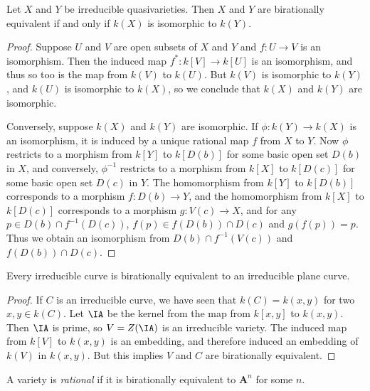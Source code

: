 \begin{theorem}
    Let $X$ and $Y$ be irreducible quasivarieties. Then $X$ and $Y$ are birationally equivalent if and only if $k(X)$ is isomorphic to $k(Y)$.
\end{theorem}
\begin{proof}
    Suppose $U$ and $V$ are open subsets of $X$ and $Y$ and $f: U \to V$ is an isomorphism. Then the induced map $f^*: k[V] \to k[U]$ is an isomorphism, and thus so too is the map from $k(V)$ to $k(U)$. But $k(V)$ is isomorphic to $k(Y)$, and $k(U)$ is isomorphic to $k(X)$, so we conclude that $k(X)$ and $k(Y)$ are isomorphic.

    Conversely, suppose $k(X)$ and $k(Y)$ are isomorphic. If $\phi: k(Y) \to k(X)$ is an isomorphism, it is induced by a unique rational map $f$ from $X$ to $Y$. Now $\phi$ restricts to a morphism from $k[Y]$ to $k[D(b)]$ for some basic open set $D(b)$ in $X$, and conversely, $\phi^{-1}$ restricts to a morphism from $k[X]$ to $k[D(c)]$ for some basic open set $D(c)$ in $Y$. The homomorphism from $k[Y]$ to $k[D(b)]$ corresponds to a morphism $f: D(b) \to Y$, and the homomorphism from $k[X]$ to $k[D(c)]$ corresponds to a morphism $g: V(c) \to X$, and for any $p \in D(b) \cap f^{-1}(D(c))$, $f(p) \in f(D(b)) \cap D(c)$ and $g(f(p)) = p$. Thus we obtain an isomorphism from $D(b) \cap f^{-1}(V(c))$ and $f(D(b)) \cap D(c)$.
\end{proof}

\begin{corollary}
    Every irreducible curve is birationally equivalent to an irreducible plane curve.
\end{corollary}
\begin{proof}
    If $C$ is an irreducible curve, we have seen that $k(C) = k(x,y)$ for two $x,y \in k(C)$. Let $\IA$ be the kernel from the map from $k[x,y]$ to $k(x,y)$. Then $\IA$ is prime, so $V = Z(\IA)$ is an irreducible variety. The induced map from $k[V]$ to $k(x,y)$ is an embedding, and therefore induced an embedding of $k(V)$ in $k(x,y)$. But this implies $V$ and $C$ are birationally equivalent.
\end{proof}

A variety is \emph{rational} if it is birationally equivalent to $\mathbf{A}^n$ for some $n$.

